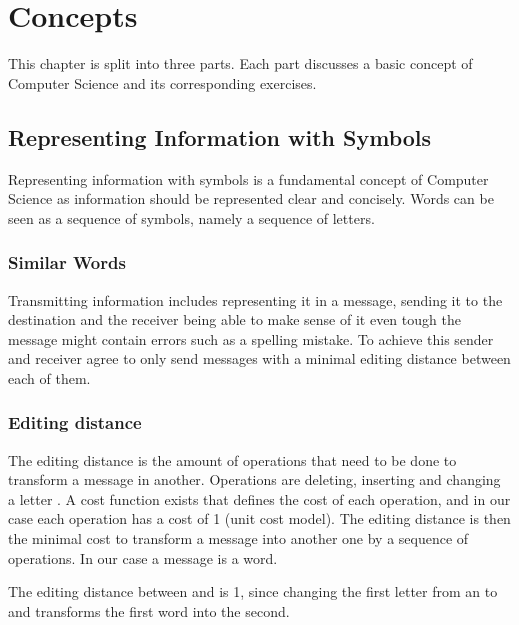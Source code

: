 \chapter{Concepts}

This chapter is split into three parts. Each part discusses a basic concept of Computer Science and its corresponding exercises.

\section{Representing Information with Symbols}
\label{section:representing_information_with_symbols}

Representing information with symbols is a fundamental concept of Computer Science as information should be represented clear and concisely. Words can be seen as a sequence of symbols, namely a sequence of letters.

\subsection{Similar Words}

Transmitting information includes representing it in a message, sending it to the destination and the receiver being able to make sense of it even tough the message might contain errors such as a spelling mistake. To achieve this sender and receiver agree to only send messages with a minimal editing distance \cite{AnD} between each of them. 

\subsection*{Editing distance}

The editing distance is the amount of operations that need to be done to transform a message in another. Operations are deleting, inserting and changing a letter . A cost function exists that defines the cost of each operation, and in our case each operation has a cost of 1 (unit cost model). The editing distance is then the minimal cost to transform a message into another one by a sequence of operations. In our case a message is a word.

\begin{example}
    The editing distance between  and  is 1, since changing the first letter from an  to and  transforms the first word into the second.
\end{example}

